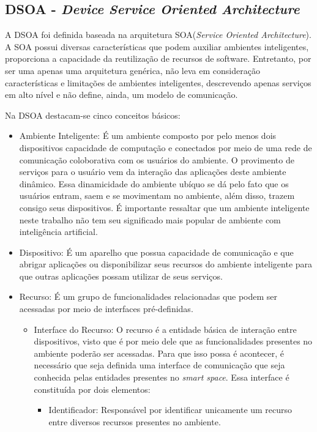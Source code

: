 \subsection{DSOA - \emph{Device Service Oriented Architecture}}

A DSOA foi definida baseada na arquitetura SOA(\emph{Service Oriented Architecture}). A SOA possui diversas características que podem auxiliar ambientes inteligentes, proporciona a capacidade da reutilização de recursos de software. Entretanto, por ser uma apenas uma arquitetura genérica, não leva em consideração características e limitações de ambientes inteligentes, descrevendo apenas serviços em alto nível e não define, ainda, um modelo de comunicação.

Na DSOA destacam-se cinco conceitos básicos:

\begin{itemize}
	\item Ambiente Inteligente:
		É um ambiente composto por pelo menos dois dispositivos capacidade de computação e conectados por meio de uma rede de comunicação coloborativa com os usuários do ambiente. O provimento de serviços para o usuário vem da interação das aplicações deste ambiente dinâmico. Essa dinamicidade do ambiente ubíquo se dá pelo fato que os usuários entram, saem e se movimentam no ambiente, além disso, trazem consigo seus dispositivos. É importante ressaltar que um ambiente inteligente neste trabalho não tem seu significado mais popular de ambiente com inteligência artificial.
	\item Dispositivo:
		É um aparelho que possua capacidade de comunicação e que abrigar aplicações ou disponibilizar seus recursos do ambiente inteligente para que outras aplicações possam utilizar de seus serviços.
	\item Recurso:
		É um grupo de funcionalidades relacionadas que podem ser acessadas por meio de interfaces pré-definidas.
		\begin{itemize}
			\item Interface do Recurso:
				O recurso é a entidade básica de interação entre dispositivos, visto que é por meio dele que as funcionalidades presentes no ambiente poderão ser acessadas. Para que isso possa é acontecer, é necessário que seja definida uma interface de comunicação que seja conhecida pelas entidades presentes no \emph{smart space}. Essa interface é constituída por dois elementos:
				\begin{itemize}
					\item Identificador:
						Responsável por identificar unicamente um recurso entre diversos recursos presentes no ambiente.

\end{itemize}
\end{itemize}
\end{itemize}
